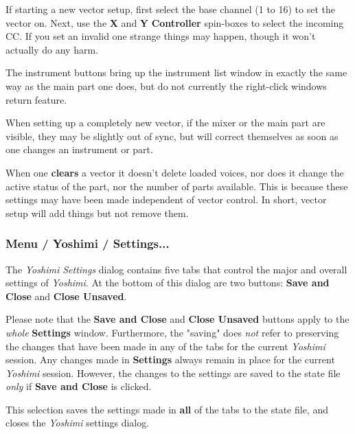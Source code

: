    If starting a new vector setup, first
   select the base channel (1 to 16) to set the vector on. Next,
   use the \textbf{X} and \textbf{Y} \textbf{Controller}
   spin-boxes to select the incoming CC.
   If you set an invalid one strange things may happen, though it won't
   actually do any harm.

   The instrument buttons bring up the instrument list window in exactly the same
   way as the main part one does, but do not currently the right-click
   windows return feature.

   When setting up a completely new vector, if the mixer or the main part are
   visible, they may be slightly out of sync, but will correct themselves as
   soon as one changes an instrument or part.

   When one \textbf{clears} a vector it doesn't delete loaded voices, nor does
   it change the active status of the part, nor the number of parts available.
   This is because these settings may have been made independent of vector
   control. In short, vector setup will add things but not remove them.

\subsubsection{Menu / Yoshimi / Settings...}
\label{subsubsec:menu_yoshimi_settings}

   The \textsl{Yoshimi Settings} dialog contains five tabs that control the
   major and overall settings of \textsl{Yoshimi}.  At the bottom of this
   dialog are two buttons:
   \textbf{Save and Close} and \textbf{Close Unsaved}.

   Please note that the \textbf{Save and Close} and \textbf{Close Unsaved}
   buttons apply to the \textsl{whole}
   \textbf{Settings} window.
   Furthermore, the "saving" does \textsl{not} refer to preserving the changes
   that have been made
   in any of the tabs for the current \textsl{Yoshimi} session.  Any changes
   made in \textbf{Settings} always remain in place for the current
   \textsl{Yoshimi} session.
   However, the changes to the settings are saved to
   the state file \textsl{only} if \textbf{Save and Close} is clicked.

   \setcounter{ItemCounter}{0}      %

   This selection saves the settings made in \textbf{all} of the tabs to the
   state file, and closes the \textsl{Yoshimi} settings dialog.

